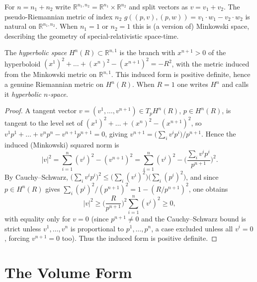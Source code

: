 \begin{example}
  \label{ex:pet-ch1-minkowski}
  \leanok
  For $n=n_1+n_2$ write $\mathbb{R}^{n_1,n_2}=\mathbb{R}^{n_1}\times\mathbb{R}^{n_2}$ and split vectors
  as $v=v_1+v_2$. The pseudo-Riemannian metric of index $n_2$
  $g((p,v),(p,w))=v_1\cdot w_1-v_2\cdot w_2$ is natural on $\mathbb{R}^{n_1,n_2}$. When
  $n_1=1$ or $n_2=1$ this is (a version of) Minkowski space, describing the
  geometry of special-relativistic space-time.
\end{example}

\begin{example}
  \label{ex:pet-ch1-hyperbolic-space}
  \leanok
  The \emph{hyperbolic space} $H^n(R)\subset\mathbb{R}^{n,1}$ is the branch with
  $x^{n+1}>0$ of the hyperboloid
  $(x^1)^2+\dots+(x^n)^2-(x^{n+1})^2=-R^2$, with the metric induced from the
  Minkowski metric on $\mathbb{R}^{n,1}$. This induced form is positive definite, hence a
  genuine Riemannian metric on $H^n(R)$. When $R=1$ one writes $H^n$ and calls it
  \emph{hyperbolic $n$-space}.
\end{example}
\begin{proof}
  \leanok
  A tangent vector $v=(v^1,\dots,v^{n+1})\in T_pH^n(R)$, $p\in H^n(R)$, is tangent
  to the level set of $(x^1)^2+\dots+(x^n)^2-(x^{n+1})^2$, so
  $v^1p^1+\dots+v^np^n-v^{n+1}p^{n+1}=0$, giving
  $v^{n+1}=\big(\sum_iv^ip^i\big)/p^{n+1}$. Hence the induced (Minkowski) squared
  norm is
  \[
    |v|^2=\sum_{i=1}^n(v^i)^2-(v^{n+1})^2
    =\sum_{i=1}^n(v^i)^2-\Big(\frac{\sum_iv^ip^i}{p^{n+1}}\Big)^2.
  \]
  By Cauchy--Schwarz, $\big(\sum_iv^ip^i\big)^2\le\big(\sum_i(v^i)^2\big)\big(\sum_i(p^i)^2\big)$,
  and since $p\in H^n(R)$ gives $\sum_i(p^i)^2/(p^{n+1})^2=1-(R/p^{n+1})^2$, one
  obtains
  \[
    |v|^2\ge\Big(\frac{R}{p^{n+1}}\Big)^2\sum_{i=1}^n(v^i)^2\ge0,
  \]
  with equality only for $v=0$ (since $p^{n+1}\ne0$ and the Cauchy--Schwarz
  bound is strict unless $v^1,\dots,v^n$ is proportional to $p^1,\dots,p^n$, a
  case excluded unless all $v^i=0$, forcing $v^{n+1}=0$ too). Thus the induced
  form is positive definite.
\end{proof}

\section{The Volume Form}

